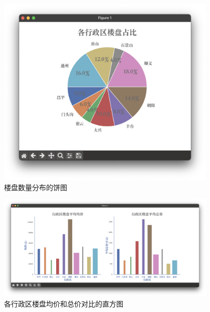 \begin{figure}[ht!]
    \begin{center}
        \includegraphics[width=0.95\textwidth]{figures/pie.png}
    \end{center}
    \caption{楼盘数量分布的饼图}
    \label{fig:楼盘数量分布的饼图}
\end{figure}

\begin{figure}[ht!]
    \begin{center}
        \includegraphics[width=0.95\textwidth]{figures/compare-bar.png}
    \end{center}
    \caption{各行政区楼盘均价和总价对比的直方图}
    \label{fig:各行政区楼盘均价和总价对比的直方图}
\end{figure}

